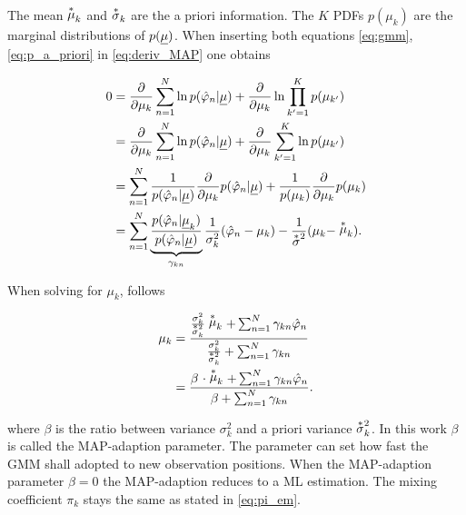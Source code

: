 The mean $\oast\mu_k$ and $\oast\sigma_k$ are the a priori information. The $K$ \acp{PDF} $p(\mu_k)$ are the marginal distributions of $p(\underline{\mu})$.  When inserting both equations \ref{eq:gmm}, \ref{eq:p_a_priori} in \ref{eq:deriv_MAP} one obtains

\begin{equation}
\begin{split}
0 &= \frac{\partial}{\partial\mu_k} \sum^{N}_{n=1}\ln p(\phih_n|\vect \mu)+ \frac{\partial}{\partial\mu_k} \ln \prod_{k'=1}^K p(\mu_{k'}) \\
&= \frac{\partial}{\partial\mu_k} \sum^{N}_{n=1}\ln p(\phih_n|\vect \mu)+ \frac{\partial}{\partial\mu_k} \sum_{{k'}=1}^K \ln p(\mu_{k'}) \\
&= \sum^{N}_{n=1} \frac{1}{p(\phih_n|\vect \mu)}\frac{\partial}{\partial\mu_k} p(\phih_n|\vect \mu) + \frac{1}{p(\mu_k)}\frac{\partial}{\partial\mu_k} p(\mu_k) \\
&= \sum^{N}_{n=1} \underbrace{\frac{p(\phih_n|\vect \mu_k)}{p(\phih_n|\vect \mu)}}_{\gamma_{kn}} \frac{1}{\sigma^2_k}(\phih_n-\mu_k) - \frac{1}{\oast \sigma^2} (\mu_k-\oast \mu_k) .
\end{split}
\end{equation}

When solving for $\mu_k$, follows

\begin{equation}
\begin{split}
\mu_k &= \frac{\frac{\sigma^2_k}{\oast\sigma^2_k}\oast \mu_k+\sum^N_{n=1}\gamma_{kn}\phih_n}{\frac{\sigma^2_k}{\oast\sigma^2_k}+\sum^N_{n=1}\gamma_{kn}}\\
&=\frac{\beta\ \cdot \oast\mu_k+\sum^N_{n=1}\gamma_{kn}\phih_n}{\beta+\sum^N_{n=1}\gamma_{kn}}.
\label{eq:mu_MAP}
\end{split}
\end{equation}


where $\beta$ is the ratio between variance $\sigma^2_k$ and a priori variance $\oast \sigma^2_k$.
In this work $\beta$ is called the MAP-adaption parameter. The parameter can set how fast the \ac{GMM} shall adopted to new observation positions. When the MAP-adaption parameter $\beta = 0$ the MAP-adaption reduces to a \ac{ML} estimation. The mixing coefficient $\pi_k$ stays the same as stated in \ref{eq:pi_em}. \cite{279278}


